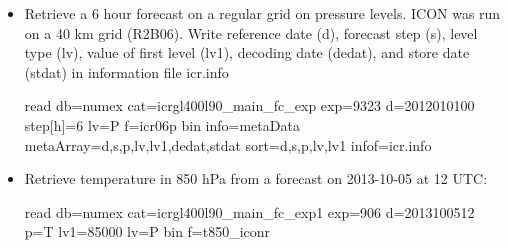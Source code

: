 \begin{itemize}
\item Retrieve a 6 hour forecast on a regular grid on pressure levels. ICON was run on a 40 km
grid (R2B06).  Write reference date (d),
forecast step (s), level type (lv), value of first level (lv1), decoding date (dedat), and
store date (stdat) in information file icr.info
\begin{skydb}
read db=numex cat=icrgl400l90_main_fc_exp exp=9323 d=2012010100 step[h]=6 lv=P f=icr06p bin info=metaData metaArray=d,s,p,lv,lv1,dedat,stdat sort=d,s,p,lv,lv1 infof=icr.info
\end{skydb}

\item Retrieve temperature in 850 hPa from a forecast on 2013-10-05 at 12 UTC:

\begin{skydb}
read db=numex cat=icrgl400l90_main_fc_exp1 exp=906 d=2013100512 p=T lv1=85000 lv=P bin f=t850_iconr
\end{skydb}

\end{itemize}
